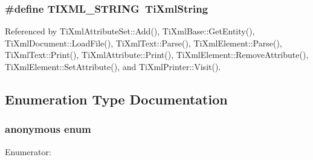 \subsubsection[TIXML\_\-STRING]{\setlength{\rightskip}{0pt plus 5cm}\#define TIXML\_\-STRING~{\bf TiXmlString}}\label{tinyxml_8h_92bada05fd84d9a0c9a5bbe53de26887}




Referenced by TiXmlAttributeSet::Add(), TiXmlBase::GetEntity(), TiXmlDocument::LoadFile(), TiXmlText::Parse(), TiXmlElement::Parse(), TiXmlText::Print(), TiXmlAttribute::Print(), TiXmlElement::RemoveAttribute(), TiXmlElement::SetAttribute(), and TiXmlPrinter::Visit().

\subsection{Enumeration Type Documentation}
\subsubsection["@0]{\setlength{\rightskip}{0pt plus 5cm}anonymous enum}\label{tinyxml_8h_06fc87d81c62e9abb8790b6e5713c55b}


\begin{Desc}
\item[Enumerator: ]\par
\begin{description}
\item[{\em 
TIXML\_\-SUCCESS\label{tinyxml_8h_06fc87d81c62e9abb8790b6e5713c55ba3e89edb94c177db48c4e29f92d737d9}
}]\item[{\em 
TIXML\_\-NO\_\-ATTRIBUTE\label{tinyxml_8h_06fc87d81c62e9abb8790b6e5713c55bb5d83b77941b021a657f1223e40dc28d}
}]\item[{\em 
TIXML\_\-WRONG\_\-TYPE\label{tinyxml_8h_06fc87d81c62e9abb8790b6e5713c55b4444723f0e0f7ba0bc120b172120d479}
}]\end{description}
\end{Desc}


